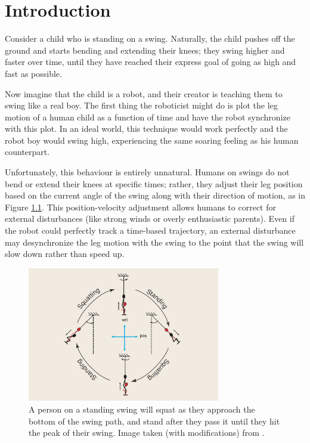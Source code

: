 

\chapter{Introduction}
Consider a child who is standing on a swing.
Naturally, the child pushes off the ground and starts bending and extending
their knees; they swing higher and faster over time, until they 
have reached their express goal of going as high and fast as possible.

Now imagine that the child is a robot, and their creator is teaching them to
swing like a real boy.
The first thing the roboticist might do is plot the leg motion of a human child
as a function of time and have the robot synchronize with this plot.
In an ideal world, this technique would work perfectly and the robot boy would
swing high, experiencing the same soaring feeling as his human counterpart.

Unfortunately, this behaviour is entirely unnatural. 
Humans on swings do not bend or extend their knees at specific times; rather,
they adjust their leg position based on the current angle of the swing along
with their direction of motion, as in Figure \ref{fig:swing-pos-vel}.
This position-velocity adjustment allows humans to correct for external
disturbances (like strong winds or overly enthusiastic parents).
Even if the robot could perfectly track a time-based trajectory, an external
disturbance may desynchronize the leg motion with the swing to the point that
the swing will slow down rather than speed up.

\begin{figure}
    \centering
    \includegraphics[width=0.75\textwidth]{images/swing_pos_vel.png}
    \caption{A person on a standing swing will squat as they approach the
        bottom of the swing path, and stand after they pass it until they hit
        the peak of their swing. Image taken (with modifications) from
    \cite{pumping_swing_standing_squatting}.}
    \label{fig:swing-pos-vel}
\end{figure}


